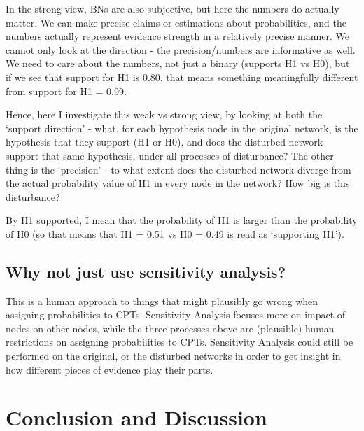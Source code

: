 \documentclass[11pt]{amsart}
\begin{document}
In the strong view, BNs are also subjective, but here the numbers do actually matter. We can make precise claims or estimations about probabilities, and the numbers actually represent evidence strength in a relatively precise manner. We cannot only look at the direction - the precision/numbers are informative as well. We need to care about the numbers, not just a binary (supports H1 vs H0), but if we see that support for H1 is 0.80, that means something meaningfully different from support for H1 = 0.99.

Hence, here I investigate this weak vs strong view, by looking at both the `support direction' - what, for each hypothesis node in the original network, is the hypothesis that they support (H1 or H0), and does the disturbed network support that same hypothesis, under all processes of disturbance?
The other thing is the `precision' - to what extent does the disturbed network diverge from the actual probability value of H1 in every node in the network? How big is this disturbance?

By H1 supported, I mean that the probability of H1 is larger than the probability of H0 (so that means that H1 = 0.51 vs H0 = 0.49 is read as `supporting H1').

\subsection{Why not just use sensitivity analysis?}
This is a human approach to things that might plausibly go wrong when assigning probabilities to CPTs. Sensitivity Analysis focuses more on impact of nodes on other nodes, while the three processes above are (plausible) human restrictions on assigning probabilities to CPTs. Sensitivity Analysis could still be performed on the original, or the disturbed networks in order to get insight in how different pieces of evidence play their parts.

\section{Conclusion and Discussion}
\end{document}

